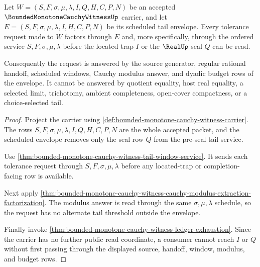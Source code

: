 \begin{theorem}
\label{thm:bounded-monotone-cauchy-witness-window-coverage}
Let $W=(S,F,\sigma,\mu,\lambda,I,Q,H,C,P,N)$ be an accepted $\BoundedMonotoneCauchyWitnessUp$ carrier, and let $E=(S,F,\sigma,\mu,\lambda,I,H,C,P,N)$ be its scheduled tail envelope. Every tolerance request made to $W$ factors through $E$ and, more specifically, through the ordered service $S,F,\sigma,\mu,\lambda$ before the located trap $I$ or the $\RealUp$ seal $Q$ can be read.

Consequently the request is answered by the source generator, regular rational handoff, scheduled windows, Cauchy modulus answer, and dyadic budget rows of the envelope. It cannot be answered by quotient equality, host real equality, a selected limit, trichotomy, ambient completeness, open-cover compactness, or a choice-selected tail.
\end{theorem}
\begin{proof}
Project the carrier using \autoref{def:bounded-monotone-cauchy-witness-carrier}. The rows $S,F,\sigma,\mu,\lambda,I,Q,H,C,P,N$ are the whole accepted packet, and the scheduled envelope removes only the seal row $Q$ from the pre-seal tail service.

Use \autoref{thm:bounded-monotone-cauchy-witness-tail-window-service}. It sends each tolerance request through $S,F,\sigma,\mu,\lambda$ before any located-trap or completion-facing row is available.

Next apply \autoref{thm:bounded-monotone-cauchy-witness-cauchy-modulus-extraction-factorization}. The modulus answer is read through the same $\sigma,\mu,\lambda$ schedule, so the request has no alternate tail threshold outside the envelope.

Finally invoke \autoref{thm:bounded-monotone-cauchy-witness-ledger-exhaustion}. Since the carrier has no further public read coordinate, a consumer cannot reach $I$ or $Q$ without first passing through the displayed source, handoff, window, modulus, and budget rows.
\end{proof}

